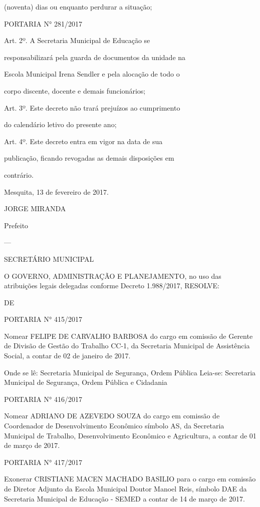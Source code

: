 \documentclass{doliberto}
\begin{document}
(noventa) dias ou enquanto perdurar a situação;  

PORTARIA N° 281/2017 

Art.  2º.  A  Secretaria  Municipal  de  Educação  se 

responsabilizará pela guarda de documentos da unidade na 

Escola  Municipal  Irena  Sendler  e  pela  alocação  de  todo  o 

corpo discente, docente e demais funcionários; 

Art.  3º.    Este  decreto  não  trará  prejuízos  ao  cumprimento 

do calendário letivo do presente ano; 

Art.  4º.  Este  decreto  entra  em  vigor  na  data  de  sua 

publicação,  ficando  revogadas  as  demais  disposições  em 

contrário. 

Mesquita, 13 de fevereiro de 2017. 

JORGE MIRANDA 

Prefeito 

---

SECRETÁRIO  MUNICIPAL 

O 
GOVERNO, 
ADMINISTRAÇÃO  E  PLANEJAMENTO,  no  uso  das 
atribuições legais delegadas conforme Decreto 1.988/2017, 
RESOLVE: 

DE 

PORTARIA N° 415/2017 

Nomear  FELIPE  DE  CARVALHO  BARBOSA  do  cargo  em 
comissão  de  Gerente  de  Divisão  de  Gestão  do  Trabalho 
CC-1,  da  Secretaria  Municipal  de  Assistência  Social,  a 
contar de 02 de janeiro de 2017. 

Onde se lê: 
Secretaria Municipal de Segurança, Ordem Pública  
Leia-se: 
Secretaria  Municipal  de  Segurança,  Ordem  Pública  e 
Cidadania 

PORTARIA N° 416/2017 

Nomear  ADRIANO  DE  AZEVEDO  SOUZA  do  cargo  em 
comissão  de  Coordenador  de  Desenvolvimento 
Econômico  símbolo  AS,  da  Secretaria  Municipal  de 
Trabalho, Desenvolvimento Econômico e Agricultura, a 
contar de 01 de março de 2017. 

PORTARIA N° 417/2017 

Exonerar  CRISTIANE  MACEN  MACHADO  BASILIO  para  o 
cargo  em  comissão  de  Diretor  Adjunto  da  Escola 
Municipal  Doutor  Manoel  Reis,  símbolo  DAE  da 
Secretaria  Municipal  de  Educação  -  SEMED  a  contar  de 
14 de março de 2017. 
\end{document}
